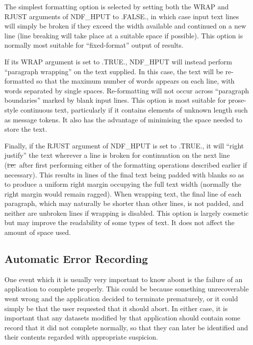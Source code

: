 The simplest formatting option is selected by setting both the WRAP
and RJUST arguments of NDF\_HPUT to .FALSE., in which case input text
lines will simply be broken if they exceed the width available and
continued on a new line (line breaking will take place at a suitable
space if possible). This option is normally most suitable for
``fixed-format'' output of results.

If its WRAP argument is set to .TRUE., NDF\_HPUT will instead perform
``paragraph wrapping'' on the text supplied. In this case, the text
will be re-formatted so that the maximum number of words appears on
each line, with words separated by single spaces. Re-formatting will
not occur across ``paragraph boundaries'' marked by blank input lines.
This option is most suitable for prose-style continuous text,
particularly if it contains elements of unknown length such as message
tokens. It also has the advantage of minimising the space needed to
store the text.

Finally, if the RJUST argument of NDF\_HPUT is set to .TRUE., it will
``right justify'' the text wherever a line is broken for continuation
on the next line (\st{i.e.}\ after first performing either of the
formatting operations described earlier if necessary). This results in
lines of the final text being padded with blanks so as to produce a
uniform right margin occupying the full text width (normally the right
margin would remain ragged). When wrapping text, the final line of
each paragraph, which may naturally be shorter than other lines, is
not padded, and neither are unbroken lines if wrapping is disabled.
This option is largely cosmetic but may improve the readability of
some types of text. It does not affect the amount of space used.

\subsection{\label{ss:historyerror}Automatic Error Recording}

One event which it is usually very important to know about is the
failure of an application to complete properly. This could be because
something unrecoverable went wrong and the application decided to
terminate prematurely, or it could simply be that the user requested
that it should abort.  In either case, it is important that any
datasets modified by that application should contain some record that
it did not complete normally, so that they can later be identified and
their contents regarded with appropriate suspicion.

